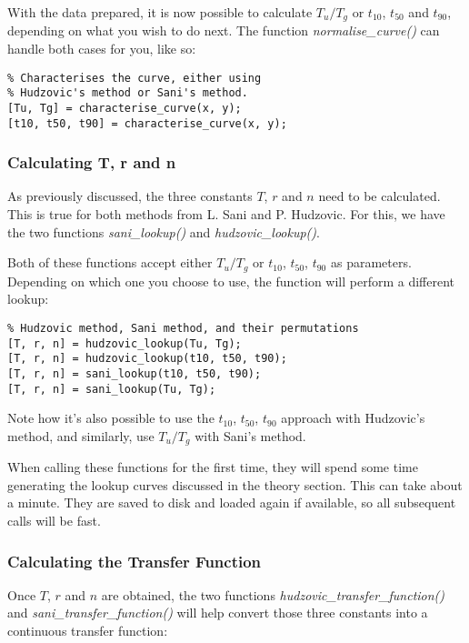 With the data prepared, it is  now  possible to calculate $T_u/T_g$ or $t_{10}$,
$t_{50}$ and $t_{90}$, depending on what you  wish  to  do  next.  The  function
\textit{normalise\_curve()}  can  handle  both   cases   for   you,   like   so:

\begin{lstlisting}
% Characterises the curve, either using
% Hudzovic's method or Sani's method.
[Tu, Tg] = characterise_curve(x, y);
[t10, t50, t90] = characterise_curve(x, y);
\end{lstlisting}


\subsubsection*{Calculating T, r and n}

As  previously discussed, the three constants  $T$,  $r$  and  $n$  need  to  be
calculated. This is true for both methods from L.  Sani  and  P.  Hudzovic.  For
this,    we    have    the    two    functions    \textit{sani\_lookup()}    and
\textit{hudzovic\_lookup()}.

Both  of these functions accept either $T_u/T_g$ or $t_{10}$, $t_{50}$, $t_{90}$
as parameters. Depending  on  which  one  you  choose  to use, the function will
perform a different lookup:

\begin{lstlisting}
% Hudzovic method, Sani method, and their permutations
[T, r, n] = hudzovic_lookup(Tu, Tg);
[T, r, n] = hudzovic_lookup(t10, t50, t90);
[T, r, n] = sani_lookup(t10, t50, t90);
[T, r, n] = sani_lookup(Tu, Tg);
\end{lstlisting}

Note how it's  also  possible  to  use the $t_{10}$, $t_{50}$, $t_{90}$ approach
with  Hudzovic's method,  and  similarly,  use  $T_u/T_g$  with  Sani's  method.

When  calling  these  functions  for  the  first time, they will spend some time
generating  the  lookup  curves  discussed in the theory section. This can  take
about a minute. They are saved to  disk  and  loaded  again if available, so all
subsequent calls will be fast.


\subsubsection*{Calculating the Transfer Function}

Once    $T$,    $r$    and    $n$    are    obtained,    the    two    functions
\textit{hudzovic\_transfer\_function()}  and \textit{sani\_transfer\_function()}
will help  convert  those  three  constants into a continuous transfer function:

